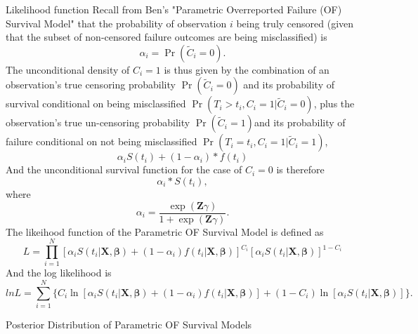 \documentclass[a4paper, 12pt]{article}
\makeatletter
\newcommand {\dsum}{\displaystyle \sum}
\newcommand {\dprod}{\displaystyle \prod}
\renewcommand{\section}{\@startsection
	{section}    {1}    {0mm}    {-0.7\baselineskip}    {0.08\baselineskip}    {\normalfont\large\sc\center\bf}}
\renewcommand{\subsection}{\@startsection
	{subsection}    {2}    {0mm}    {-0.5\baselineskip}    {0.01\baselineskip}    {\normalfont\normalsize\itshape\center}}
\makeatother
\begin{document}
\subsection{Likelihood function}
\noindent Recall from Ben's "Parametric Overreported Failure (OF) Survival Model" that the
probability of observation $i$ being truly censored (given that the subset of non-censored failure
outcomes are being misclassified) is%
\begin{equation}
\alpha_i =\Pr (\widetilde{C}_{i}=0).
\end{equation}
The unconditional density of $C_i = 1$ is thus given by the combination of an
observation's true censoring probability $\Pr (\widetilde{C}_{i}=0)$ and its probability of
survival conditional on being misclassified $\Pr (T_i > t_i , C_i =1 |\widetilde{C}_{i}=0)$, plus the observation's true un-censoring probability $\Pr (\widetilde{C}_{i}=1)$and its probability of failure conditional on not being misclassified $\Pr (T_i =t_i , C_i =1 |\widetilde{C}_{i}=1)$,%
\begin{equation}
\alpha _{i}S(t_i)+(1-\alpha _{i})\ast f(t_{i})
\end{equation}
And the unconditional survival function for the case of $C_i = 0$ is therefore%
\begin{equation}
\alpha _{i}\ast S(t_{i}),
\end{equation}
where
\begin{equation}
\alpha _{i}=\frac{\exp (\mathbf{Z}\gamma )}{1+\exp (\mathbf{Z}\gamma )}.
\end{equation}
The likeihood function of the Parametric OF Survival Model is defined as 
\begin{equation}
L=\dprod\limits_{i=1}^{N}[\alpha _{i}S(t_{i}|\mathbf{X,}%
\mathbf{\beta})+(1-\alpha _{i})f(t_{i}|\mathbf{X},\mathbf{\beta}
)]^{C_{i}}[\alpha _{i}S(t_{i}|\mathbf{X,}\mathbf{\beta})]^{1-C_{i}}
\end{equation}
And the log likelihood is%
\begin{equation}
lnL=\dsum\limits_{i=1}^{N}\{C_{i}\ln [\alpha _{i}S(t_{i}|\mathbf{X,}%
\mathbf{\beta})+(1-\alpha
_{i})f(t_{i}|\mathbf{X},\mathbf{\beta})]+(1-C_{i})\ln [\alpha _{i}S(t_{i}|\mathbf{X,}%
\mathbf{\beta})]\}.
\end{equation}
\section{Posterior Distribution of Parametric OF Survival Models}
\iffalse\noindent The parametric survival models, also known as accelerated failure time models (AFT models), includes exponential, log-normal, log-logistic, and Weibull distributions. Although the classical approach is the maximum likelihood for parameter estimation, here we use Bayesian analysis to model Exponential and Weibull cases.\fi
\end{document}
